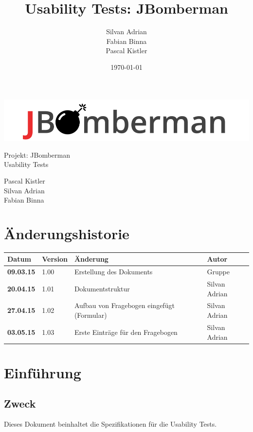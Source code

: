 \documentclass[11pt]{scrartcl}
\title{Usability Tests: JBomberman}
\author{Silvan Adrian \\ Fabian Binna \\ Pascal Kistler}
\date{\today{}}
\begin{document}
\def\arraystretch{1.5}
\begin{titlepage}
\begin{center}
\vspace{10em}
\includegraphics[scale=2]{jbomberman}
\vspace{10em}
\end{center}
\begin{center}
\huge {Projekt: JBomberman} \\
\huge {Usability Tests}
\end{center}
\begin{center}
\vspace{10em}
\LARGE {Pascal Kistler} \\
\LARGE {Silvan Adrian} \\
\LARGE {Fabian Binna}
\end{center}

\end{titlepage}

\newpage
\section{Änderungshistorie}
\label{sec:Änderungen}

\begin{tabularx}{\linewidth}{l l l l}
\textbf{Datum} & \textbf{Version} & \textbf{Änderung}  & \textbf{Autor} \\
\hline
\textbf{09.03.15} & 1.00 & Erstellung des Dokuments & Gruppe \\
\textbf{20.04.15} & 1.01 & Dokumentstruktur & Silvan Adrian \\
\textbf{27.04.15} & 1.02 & Aufbau von Fragebogen eingefügt (Formular) & Silvan Adrian \\
\bf{03.05.15} & 1.03 & Erste Einträge für den Fragebogen & Silvan Adrian \\

\end{tabularx}

\newpage
\tableofcontents
\newpage
\section{Einführung}
\subsection{Zweck}
Dieses Dokument beinhaltet die Spezifikationen für die Usability Tests.
\end{document}
